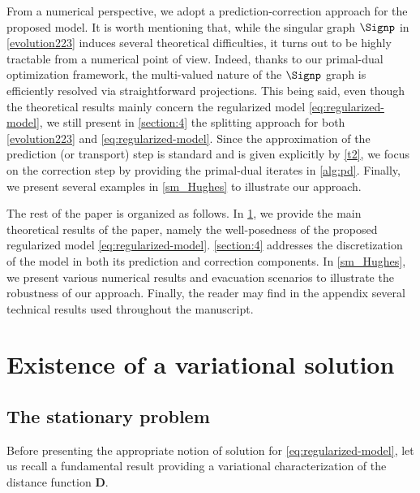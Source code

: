 \documentclass[final,reqno]{amsart}
\theoremstyle{plain}
\theoremstyle{definition}
\theoremstyle{remark}
\numberwithin{remark}{section}	%
\numberwithin{example}{section}	%
\newcommand{\de}{\mathbf{D}}
\begin{document}
From a numerical perspective, we adopt a prediction-correction approach for the proposed model. It is worth mentioning that, while the singular graph $\Signp$ in \eqref{evolution223} induces several theoretical difficulties, it turns out to be highly tractable from a numerical point of view. Indeed, thanks to our primal-dual optimization framework, the multi-valued nature of the $\Signp$ graph is efficiently resolved via straightforward projections. This being said, even though the theoretical results mainly concern the regularized model \eqref{eq:regularized-model}, we still present in \cref{section:4} the splitting approach for both \eqref{evolution223} and \eqref{eq:regularized-model}. Since the approximation of the prediction (or transport) step is standard and is given explicitly by \eqref{t2}, we focus on the correction step by providing the primal-dual iterates in \cref{alg:pd}. Finally, we present several examples in \cref{sm_Hughes} to illustrate our approach.

The rest of the paper is organized as follows. In \cref{section:existence}, we provide the main theoretical results of the paper, namely the well-posedness of the proposed regularized model \eqref{eq:regularized-model}. \cref{section:4} addresses the discretization of the model in both its prediction and correction components. In \cref{sm_Hughes}, we present various numerical results and evacuation scenarios to illustrate the robustness of our approach. Finally, the reader may find in the appendix several technical results used throughout the manuscript.


\section{Existence of a variational solution}\label{section:existence}
\subsection{The stationary problem}
Before presenting the appropriate notion of solution for \eqref{eq:regularized-model}, let us recall a fundamental result providing a variational characterization of the distance function $\de$.
\end{document}
